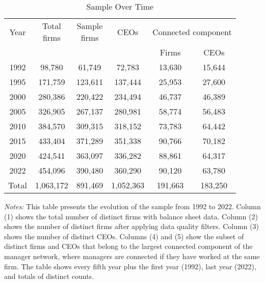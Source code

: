 \begin{table}[htbp]
\centering
\caption{Sample Over Time}
\label{tab:sample}
\begin{tabular}{*{6}{c}}
\toprule
Year & \shortstack{Total\\firms} & \shortstack{Sample\\firms} & CEOs & \multicolumn{2}{c}{Connected component} \\
\cmidrule(lr){5-6}
 & & & & Firms & CEOs \\
\midrule
1992 &       98,780 &       61,749 &       72,783 &       13,630 &       15,644 \\
1995 &      171,759 &      123,611 &      137,444 &       25,953 &       27,600 \\
2000 &      280,386 &      220,422 &      234,494 &       46,737 &       46,389 \\
2005 &      326,905 &      267,137 &      280,981 &       58,774 &       56,483 \\
2010 &      384,570 &      309,315 &      318,152 &       73,783 &       64,442 \\
2015 &      433,404 &      371,289 &      351,338 &       90,766 &       70,182 \\
2020 &      424,541 &      363,097 &      336,282 &       88,861 &       64,317 \\
2022 &      454,096 &      390,480 &      360,290 &       90,120 &       63,780 \\
\midrule
Total &    1,063,172 &      891,469 &    1,052,363 &      191,663 &      183,250 \\
\bottomrule
\end{tabular}
\begin{minipage}{12cm}
\footnotesize
\textit{Notes:} This table presents the evolution of the sample from 1992 to 2022. Column (1) shows the total number of distinct firms with balance sheet data. Column (2) shows the number of distinct firms after applying data quality filters. Column (3) shows the number of distinct CEOs. Columns (4) and (5) show the subset of distinct firms and CEOs that belong to the largest connected component of the manager network, where managers are connected if they have worked at the same firm. The table shows every fifth year plus the first year (1992), last year (2022), and totals of distinct counts. \end{minipage}
\end{table}
